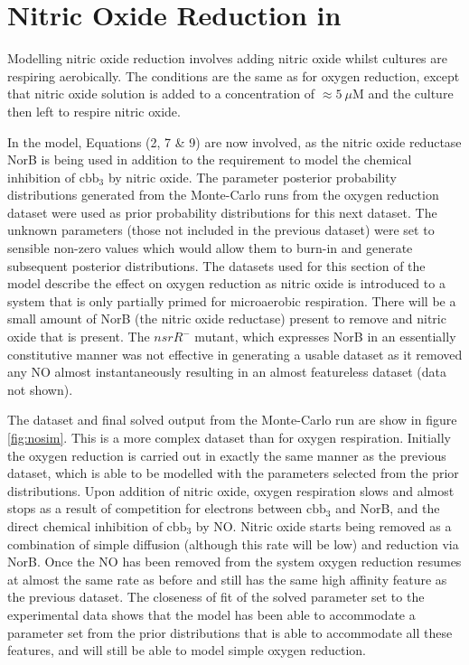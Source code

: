 \chapter{Nitric Oxide Reduction in \Nm{}}
\label{chap:noreduction}

Modelling nitric oxide reduction involves adding nitric oxide whilst cultures are respiring aerobically. The conditions are the same as for oxygen reduction, except that nitric oxide solution is added to a concentration of $\approx 5~\mu$M and the culture then left to respire nitric oxide.

In the model, Equations (2, 7 \& 9) are now involved, as the nitric oxide reductase NorB is being used in addition to the requirement to model the chemical inhibition of $\mathrm{cbb}_3$ by nitric oxide. The parameter posterior probability distributions generated from the Monte-Carlo runs from the oxygen reduction dataset were used as prior probability distributions for this next dataset. The unknown parameters (those not included in the previous dataset) were set to sensible non-zero values which would allow them to burn-in and generate subsequent posterior distributions.
The datasets used for this section of the model describe the effect on oxygen reduction as nitric oxide is introduced to a system that is only partially primed for microaerobic respiration. There will be a small amount of NorB (the nitric oxide reductase) present to remove and nitric oxide that is present. The $\mathit{nsrR}^-$ mutant, which expresses NorB in an essentially constitutive manner was not effective in generating a usable dataset as it removed any NO almost instantaneously resulting in an almost featureless dataset (data not shown).

The dataset and final solved output from the Monte-Carlo run are show in figure \ref{fig:nosim}. This is a more complex dataset than for oxygen respiration. Initially the oxygen reduction is carried out in exactly the same manner as the previous dataset, which is able to be modelled with the parameters selected from the prior distributions. Upon addition of nitric oxide, oxygen respiration slows and almost stops as a result of competition for electrons between $\mathrm{cbb}_3$ and NorB, and the direct chemical inhibition of $\mathrm{cbb}_3$ by NO. Nitric oxide starts being removed as a combination of simple diffusion (although this rate will be low) and reduction via NorB. Once the NO has been removed from the system oxygen reduction resumes at almost the same rate as before and still has the same high affinity feature as the previous dataset. The closeness of fit of the solved parameter set to the experimental data shows that the model has been able to accommodate a parameter set from the prior distributions that is able to accommodate all these features, and will still be able to model simple oxygen reduction.

